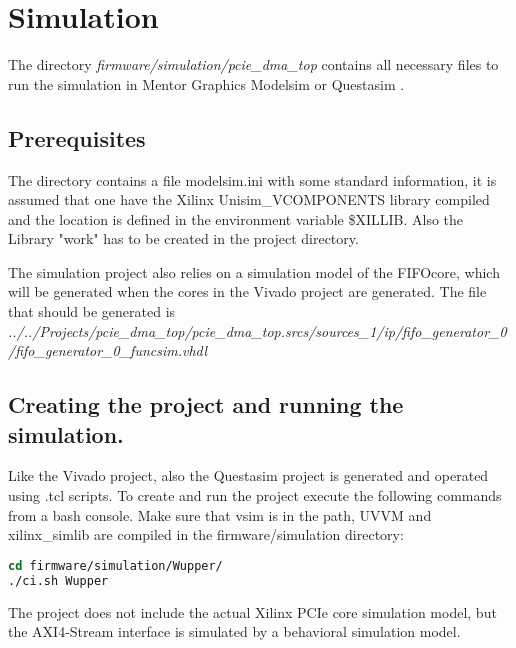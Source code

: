 \section{Simulation}
The directory \textit{firmware/simulation/pcie\_dma\_top} contains all necessary files to run the simulation in Mentor Graphics Modelsim or Questasim \cite{questasim}. 

\subsection{Prerequisites}
The directory contains a file modelsim.ini with some standard information, it is assumed that one have the Xilinx Unisim\_VCOMPONENTS library compiled and the location is defined in the environment variable \$XILLIB. Also the Library "work" has to be created in the project directory.

The simulation project also relies on a simulation model of the FIFOcore, which will be generated when the cores in the Vivado project are generated. The file that should be generated is \textit{../../Projects/pcie\_dma\_top/pcie\_dma\_top.srcs/sources\_1/ip/fifo\_generator\_0 /fifo\_generator\_0\_funcsim.vhdl}

\subsection{Creating the project and running the simulation.}
Like the Vivado project, also the Questasim project is generated and operated using .tcl scripts. To create and run the project execute the following commands from a bash console. Make sure that vsim is in the path, UVVM and xilinx\_simlib are compiled in the firmware/simulation directory:
\begin{lstlisting}[language=tcl, frame=single, caption=Run the simulation]
cd firmware/simulation/Wupper/
./ci.sh Wupper
\end{lstlisting}
The project does not include the actual Xilinx PCIe core simulation model, but the AXI4-Stream interface is simulated by a behavioral simulation model.
\newpage
